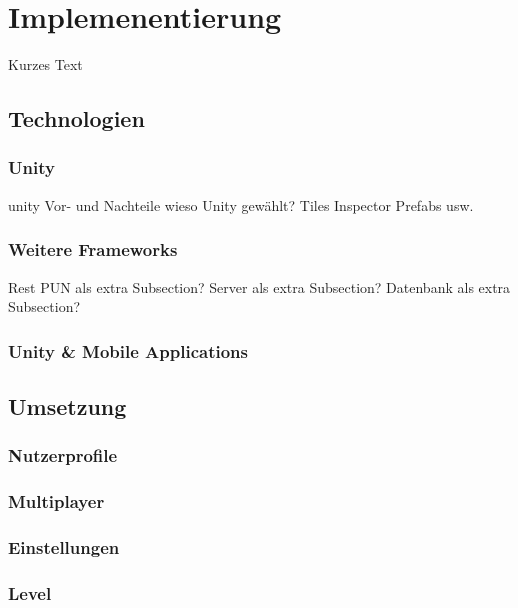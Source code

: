 \chapter{Implemenentierung}
\label{cha:implementierung}
Kurzes Text

\section{Technologien}
\label{sec:grundlagen:technologien}

\subsection{Unity}
\label{subsec:grundlagen:technologien:unity}
unity
Vor- und Nachteile
wieso Unity gewählt?
Tiles 
Inspector
Prefabs
usw.

\subsection{Weitere Frameworks}
\label{subsec:implementierung:technologien:frameworks}
Rest
PUN als extra Subsection?
Server als extra Subsection?
Datenbank als extra Subsection?

\subsection{Unity \& Mobile Applications}
\label{subsec:implementierung:technologien:mobile}

\section{Umsetzung}
\label{sec:grundlagen:umsetzung}

\subsection{Nutzerprofile}
\label{subsec:implementierung:umsetzung:nutzerprofile}

\subsection{Multiplayer}
\label{subsec:implementierung:umsetzung:multiplayer}

\subsection{Einstellungen}
\label{subsec:implementierung:umsetzung:einstellungen}

\subsection{Level}
\label{subsec:implementierung:umsetzung:level}
